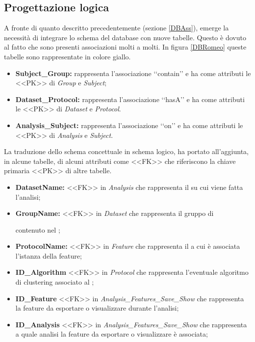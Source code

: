 \subsection{Progettazione logica}
\label{DBLog}
A fronte di quanto descritto precedentemente (sezione \ref{DBAss}), emerge la necessità di integrare lo schema del database con nuove tabelle. Questo è dovuto al fatto che sono presenti associazioni molti a molti. In figura \ref{DBRomeo} queste tabelle sono rappresentate in colore giallo.
\begin{itemize}
\item \textbf{Subject\_Group:} rappresenta l'associazione \lq\lq{}contain\rq\rq{} e ha come attributi le <<PK>> di \textit{Group} e \textit{Subject};

\item \textbf{Dataset\_Protocol:} rappresenta l'associazione \lq\lq{}hasA\rq\rq{} e ha come attributi le <<PK>> di \textit{Dataset} e \textit{Protocol}.

\item \textbf{Analysis\_Subject:} rappresenta l'associazione \lq\lq{}on\rq\rq{} e ha come attributi le <<PK>> di \textit{Analysis} e \textit{Subject}.
\end{itemize}
La traduzione dello schema concettuale in schema logico, ha portato all'aggiunta, in alcune tabelle, di alcuni attributi come <<FK>> che riferiscono la chiave primaria <<PK>> di altre tabelle.
\begin{itemize}
\item \textbf{DatasetName:} <<FK>> in \textit{Analysis} che rappresenta il \dataset{} su cui viene fatta l'analisi;
\item \textbf{GroupName:} <<FK>> in \textit{Dataset} che rappresenta il gruppo di \subject{} contenuto nel \dataset{};
\item \textbf{ProtocolName:} <<FK>> in \textit{Feature} che rappresenta il \protocol{} a cui è associata l'istanza della feature\glossario{};
\item \textbf{ID\_Algorithm} <<FK>> in \textit{Protocol} che rappresenta l'eventuale algoritmo di clustering\glossario{} associato al \protocol{};

\item \textbf{ID\_Feature} <<FK>> in \textit{Analysis\_Features\_Save\_Show} che rappresenta la feature\glossario{} da esportare o visualizzare durante l'analisi;
\item \textbf{ID\_Analysis} <<FK>> in \textit{Analysis\_Features\_Save\_Show} che rappresenta a quale analisi la feature\glossario{} da esportare o visualizzare è associata;
\end{itemize}